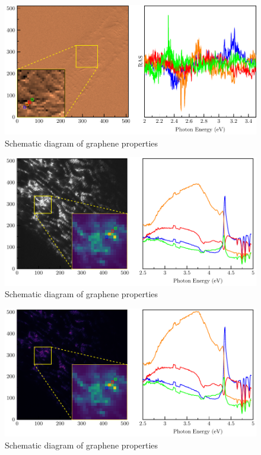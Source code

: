 \begin{figure}
	\centering
	\includegraphics[width=0.8\linewidth]{FIGURES/Anexo-CuSn/1slmpp-ras-0.pdf}
	\caption{Schematic diagram of graphene properties}
	\label{fig:introfig32}
\end{figure}

\begin{figure}
	\centering
	\includegraphics[width=0.8\linewidth]{FIGURES/Anexo-CuSn/2slmpp-0.pdf}
	\caption{Schematic diagram of graphene properties}
	\label{fig:introfig32}
\end{figure}



\begin{figure}
	\centering
	\includegraphics[width=0.8\linewidth]{FIGURES/Anexo-CuSn/2slmpp-r-0.pdf}
	\caption{Schematic diagram of graphene properties}
	\label{fig:introfig32}
\end{figure}


